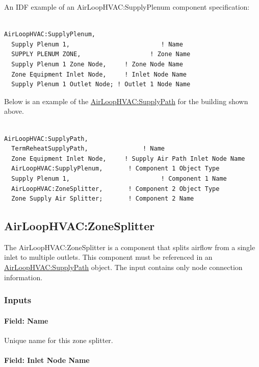 An IDF example of an AirLoopHVAC:SupplyPlenum component specification:

\begin{lstlisting}

AirLoopHVAC:SupplyPlenum,
  Supply Plenum 1,                         ! Name
  SUPPLY PLENUM ZONE,                   ! Zone Name
  Supply Plenum 1 Zone Node,     ! Zone Node Name
  Zone Equipment Inlet Node,     ! Inlet Node Name
  Supply Plenum 1 Outlet Node; ! Outlet 1 Node Name
\end{lstlisting}

Below is an example of the \hyperref[airloophvacsupplypath]{AirLoopHVAC:SupplyPath} for the building shown above.

\begin{lstlisting}

AirLoopHVAC:SupplyPath,
  TermReheatSupplyPath,               ! Name
  Zone Equipment Inlet Node,     ! Supply Air Path Inlet Node Name
  AirLoopHVAC:SupplyPlenum,       ! Component 1 Object Type
  Supply Plenum 1,                         ! Component 1 Name
  AirLoopHVAC:ZoneSplitter,       ! Component 2 Object Type
  Zone Supply Air Splitter;       ! Component 2 Name
\end{lstlisting}

\subsection{AirLoopHVAC:ZoneSplitter}\label{airloophvaczonesplitter}

The AirLoopHVAC:ZoneSplitter is a component that splits airflow from a single inlet to multiple outlets. This component must be referenced in an \hyperref[airloophvacsupplypath]{AirLoopHVAC:SupplyPath} object. The input contains only node connection information.

\subsubsection{Inputs}

\paragraph{Field: Name}

Unique name for this zone splitter.

\paragraph{Field: Inlet Node Name}

